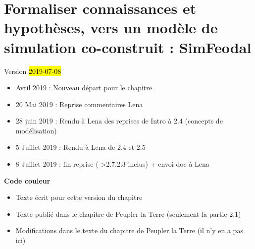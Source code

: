 \chapter{Formaliser connaissances et hypothèses, vers un modèle de simulation co-construit : SimFeodal}
\label{chap:chap2}
\begin{center}
	{\large Version \hl{2019-07-08}}
\end{center}

\begin{itemize}
	\item Avril 2019 : Nouveau départ pour le chapitre
	\item 20 Mai 2019 : Reprise commentaires Lena
	\item 28 juin 2019 : Rendu à Lena des reprises de Intro à 2.4 (concepts de modélisation)
	\item 5 Juillet 2019 : Rendu à Lena de 2.4 et 2.5
	\item 8 Juillet 2019 : fin reprise (->2.7.2.3 inclus) + envoi doc à Lena
\end{itemize}
\setcounter{minitocdepth}{1}

	\minitoc


\textbf{Code couleur}
\begin{itemize}
	\item Texte écrit pour cette version du chapitre
	\item {\redroman Texte publié dans le chapitre de Peupler la Terre} (seulement la partie 2.1)
	\item {\blueroman Modifications dans le texte du chapitre de Peupler la Terre} (il n'y en a pas ici)
\end{itemize}

\clearpage

